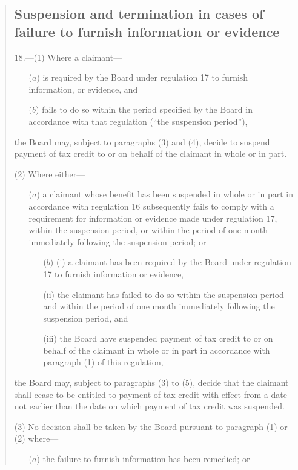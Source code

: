 \documentclass[12pt,a4paper]{article}
\begin{document}
\begin{quotation}
\subsection*{Suspension and termination in cases of failure to furnish information or evidence}

18.---(1)  Where a claimant—
\begin{enumerate}\item[]
($a$) is required by the Board under regulation 17 to furnish information, or evidence, and

($b$) fails to do so within the period specified by the Board in accordance with that regulation (“the suspension period”),
\end{enumerate}
the Board may, subject to paragraphs (3) and (4), decide to suspend payment of tax credit to or on behalf of the claimant in whole or in part.

(2) Where either—
\begin{enumerate}\item[]
($a$) a claimant whose benefit has been suspended in whole or in part in accordance with regulation 16 subsequently fails to comply with a requirement for information or evidence made under regulation 17, within the suspension period, or within the period of one month immediately following the suspension period; or

\begin{enumerate}\item[($b$)] (i) a claimant has been required by the Board under regulation 17 to furnish information or evidence,

(ii) the claimant has failed to do so within the suspension period and within the period of one month immediately following the suspension period, and

(iii) the Board have suspended payment of tax credit to or on behalf of the claimant in whole or in part in accordance with paragraph (1) of this regulation,
\end{enumerate}
\end{enumerate}
the Board may, subject to paragraphs (3) to (5), decide that the claimant shall cease to be entitled to payment of tax credit with effect from a date not earlier than the date on which payment of tax credit was suspended.

(3) No decision shall be taken by the Board pursuant to paragraph (1) or (2) where—
\begin{enumerate}\item[]
($a$) the failure to furnish information has been remedied; or


\end{enumerate}
\end{quotation}
\end{document}
